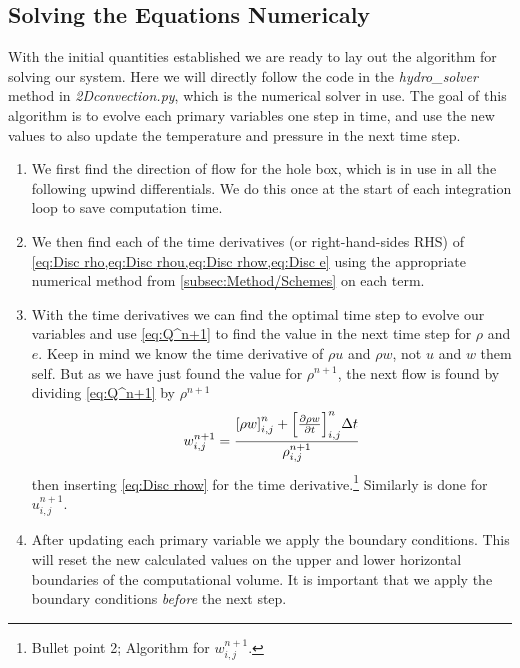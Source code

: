 \documentclass[11pt,a4paper,twocolumn,titlepage]{article}
\newcommand{\disc}[1]    %
{
\ensuremath
\qty[#1]_{i,j}^{n}
}
\begin{document}
\subsection{Solving the Equations Numericaly}\label{subsec:Method/Solving equations}
With the initial quantities established we are ready to lay out the algorithm for solving our system. Here we will directly follow the code in the \textit{hydro\_solver} method in \textit{{2Dconvection.py}}, which is the numerical solver in use. The goal of this algorithm is to evolve each primary variables one step in time, and use the new values to also update the temperature and pressure in the next time step.
\begin{enumerate}
\item We first find the direction of flow for the hole box, which is in use in all the following upwind differentials. We do this once at the start of each integration loop to save computation time.

\item We then find each of the time derivatives (or right-hand-sides RHS) of \cref{eq:Disc rho,eq:Disc rhou,eq:Disc rhow,eq:Disc e} using the appropriate numerical method from \cref{subsec:Method/Schemes} on each term. 

\item With the time derivatives we can find the optimal time step to evolve our variables and use \cref{eq:Q^n+1} to find the value in the next time step for $\rho$ and $e$. Keep in mind we know the time derivative of $\rho u$ and $\rho w$, not $u$ and $w$ them self. But as we have just found the value for $\rho^{n+1}$, the next flow is found by dividing \cref{eq:Q^n+1} by $\rho^{n+1}$
\begin{equation}
w_{i,j}^{n+1} = \frac{\disc{\rho w}+\disc{\pdv{\rho w}{t}}\Delta t}{\rho_{i,j}^{n+1}}
\label{eq:w^n+1}
\end{equation}
then inserting \cref{eq:Disc rhow} for the time derivative.\footnote{Bullet point 2; Algorithm for $w_{i,j}^{n+1}$.} Similarly is done for $u_{i,j}^{n+1}$.

\item After updating each primary variable we apply the boundary conditions. This will reset the new calculated values on the upper and lower horizontal boundaries of the computational volume. It is important that we apply the boundary conditions \textit{before} the next step.


\end{enumerate}
\end{document}
